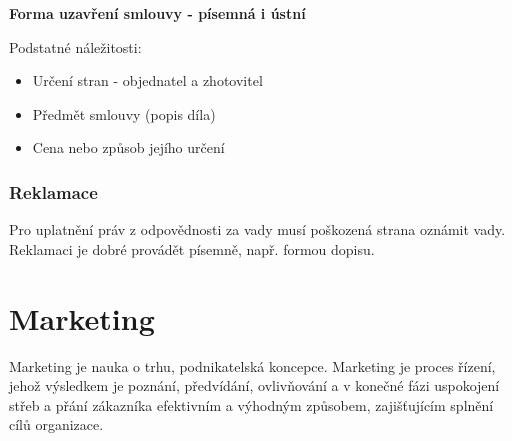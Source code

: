 \documentclass[11pt,a4paper,twoside]{book}
\begin{document}
	\textbf{Forma uzavření smlouvy - písemná i ústní}

	Podstatné náležitosti:
	\begin{itemize}
		\item Určení stran - objednatel a zhotovitel
		\item Předmět smlouvy (popis díla)
		\item Cena nebo způsob jejího určení	
	\end{itemize}

	\subsection*{Reklamace}
	Pro uplatnění práv z odpovědnosti za vady musí poškozená strana oznámit vady.
	Reklamaci je dobré provádět písemně, např. formou dopisu.


	\chapter{Marketing}

	Marketing je nauka o trhu, podnikatelská koncepce. Marketing je proces řízení, jehož výsledkem je poznání, předvídání, ovlivňování a v konečné fázi uspokojení střeb a přání zákazníka efektivním a výhodným způsobem, zajišťujícím splnění cílů organizace.
\end{document}

